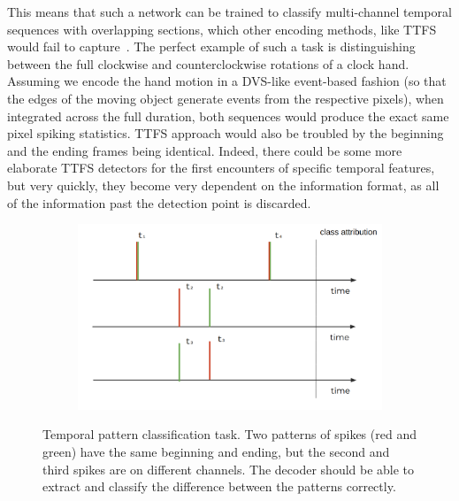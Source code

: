 This means that such a network can be trained to classify multi-channel temporal sequences with overlapping sections, which other encoding methods, like \ac{TTFS} would fail to capture~\cite{Auge_etal21}. The perfect example of such a task is distinguishing between the full clockwise and counterclockwise rotations of a clock hand. Assuming we encode the hand motion in a \ac{DVS}-like event-based fashion (so that the edges of the moving object generate events from the respective pixels), when integrated across the full duration, both sequences would produce the exact same pixel spiking statistics. \ac{TTFS} approach would also be troubled by the beginning and the ending frames being identical. Indeed, there could be some more elaborate \ac{TTFS} detectors for the first encounters of specific temporal features, but very quickly, they become very dependent on the information format, as all of the information past the detection point is discarded.

\begin{figure}[h!]
  \centering
  \begin{subfigure}{0.7\textwidth}
    \includegraphics[width=\linewidth]{img/chapter3/temporal_pattern_task.png}
    \caption{}
  \end{subfigure}
    \caption[Temporal pattern classification task]{Temporal pattern classification task. Two patterns of spikes (red and green) have the same beginning and ending, but the second and third spikes are on different channels. The decoder should be able to extract and classify the difference between the patterns correctly.}
  \label{fig:temporal_pattern_task}
\end{figure}

